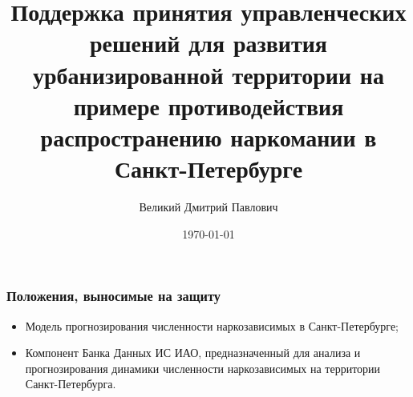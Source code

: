 \documentclass[t]{beamer}  %
\title{Поддержка принятия управленческих решений для развития урбанизированной
    территории на примере противодействия распространению наркомании в
    Санкт-Петербурге}
\author{Великий Дмитрий Павлович}
\date{\today}
\institute[ИТМО]{Университет ИТМО \\ Кафедра управления государственными
    информационными системами}
\begin{document}
\frame[plain]{\titlepage}	%

\begin{frame}
    \frametitle{Положения, выносимые на защиту}%
	\begin{itemize}
        \item \alert{Модель} прогнозирования численности наркозависимых в
            Санкт-Петербурге;
        \item \alert{Компонент} Банка Данных ИС ИАО, предназначенный для анализа и
            прогнозирования динамики численности наркозависимых на территории
            Санкт-Петербурга.
	\end{itemize}
\end{frame}
\end{document}
